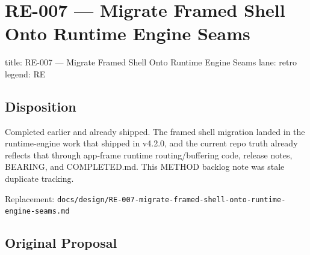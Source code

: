 \chapter{RE-007 --- Migrate Framed Shell Onto Runtime Engine Seams}\label{record-396}

\smallskip

\begin{RecordMeta}
title: RE-007 — Migrate Framed Shell Onto Runtime Engine Seams
lane: retro
legend: RE

\end{RecordMeta}

\section{Disposition}\label{record-396-disposition}

Completed earlier and already shipped. The framed shell migration landed in the runtime-engine work that shipped in v4.2.0, and the current repo truth already reflects that through app-frame runtime routing/buffering code, release notes, BEARING, and COMPLETED.md. This METHOD backlog note was stale duplicate tracking.

Replacement: \texttt{d\allowbreak{}o\allowbreak{}c\allowbreak{}s\allowbreak{}/\allowbreak{}d\allowbreak{}e\allowbreak{}s\allowbreak{}i\allowbreak{}g\allowbreak{}n\allowbreak{}/\allowbreak{}R\allowbreak{}E\allowbreak{}-\allowbreak{}0\allowbreak{}0\allowbreak{}7\allowbreak{}-\allowbreak{}m\allowbreak{}i\allowbreak{}g\allowbreak{}r\allowbreak{}a\allowbreak{}t\allowbreak{}e\allowbreak{}-\allowbreak{}f\allowbreak{}r\allowbreak{}a\allowbreak{}m\allowbreak{}e\allowbreak{}d\allowbreak{}-\allowbreak{}s\allowbreak{}h\allowbreak{}e\allowbreak{}l\allowbreak{}l\allowbreak{}-\allowbreak{}o\allowbreak{}n\allowbreak{}t\allowbreak{}o\allowbreak{}-\allowbreak{}r\allowbreak{}u\allowbreak{}n\allowbreak{}t\allowbreak{}i\allowbreak{}m\allowbreak{}e\allowbreak{}-\allowbreak{}e\allowbreak{}n\allowbreak{}g\allowbreak{}i\allowbreak{}n\allowbreak{}e\allowbreak{}-\allowbreak{}s\allowbreak{}e\allowbreak{}a\allowbreak{}m\allowbreak{}s\allowbreak{}.\allowbreak{}m\allowbreak{}d}

\section{Original Proposal}\label{record-396-original-proposal}


